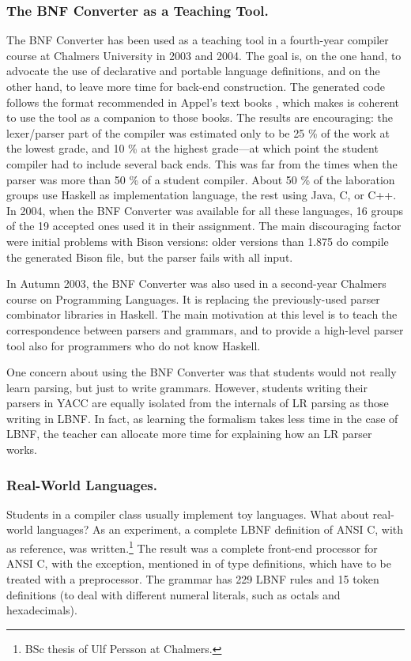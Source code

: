 \documentclass{llncs}
\newcommand{\shortsection}[1]{\subsubsection*{#1.}} %
\begin{document}
\shortsection{The BNF Converter as a Teaching Tool}

\label{results}

The BNF Converter has been used as a teaching tool in a
fourth-year compiler course at Chalmers University in 2003 and 2004.
The goal is, on the one hand, to advocate the use of declarative
and portable language definitions, and on the other hand, to
leave more time for back-end construction. The generated code
follows the format recommended in Appel's text books \cite{AppelC,AppelJ,appel},
which makes is coherent to use the tool as a companion to those books.
The results are encouraging: the lexer/parser part of the compiler 
was estimated only to be 25 \% of the work at the lowest grade, 
and 10 \% at the highest grade---at which point the student compiler had to 
include several back ends. This was far from the times 
when the parser was more than 50 \% of a student compiler.
About 50 \% of the laboration groups use Haskell as implementation
language, the rest using Java, C, or C++. 
In 2004, when the BNF Converter was available for all these languages,
16 groups of the 19 accepted ones used it in their assignment.
The main discouraging factor were initial problems with Bison
versions: older versions than 1.875 do compile the generated Bison file,
but the parser fails with all input.

In Autumn 2003, the BNF Converter was also used in a second-year Chalmers course
on Programming Languages. It is replacing the previously-used parser 
combinator libraries in Haskell.
The main motivation at this level is to teach the correspondence
between parsers and grammars, and to
provide a high-level parser tool also for programmers who do not know Haskell.

One concern about using the BNF Converter 
was that students would not really learn parsing, but just to write grammars. 
However, students writing their parsers in YACC 
are equally isolated from the internals of LR parsing as 
those writing in LBNF. In fact, as learning
the formalism takes less time in the case of LBNF, 
the teacher can allocate more
time for explaining how an LR parser works. 



\shortsection{Real-World Languages}

\label{real}

Students in a compiler class usually implement toy languages.
What about real-world languages?
As an experiment, a complete LBNF definition of
ANSI C, with \cite{Kern88} as reference, was 
written.\footnote{
BSc thesis of Ulf Persson at Chalmers.}
 The result was a complete front-end processor for ANSI C, 
with the exception, mentioned in \cite{Kern88} of type definitions,
which have to be treated with a preprocessor. The grammar has 229
LBNF rules and 15 token definitions (to deal with different numeral
literals, such as octals and hexadecimals).
\end{document}
